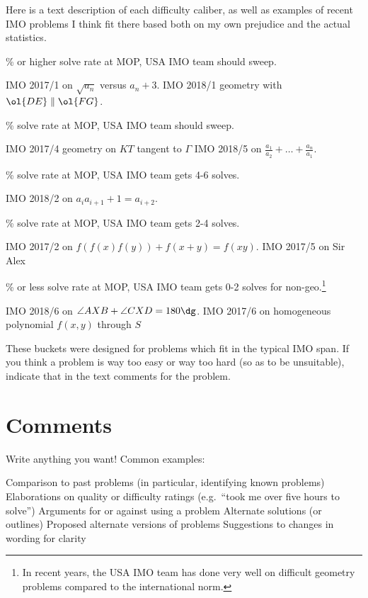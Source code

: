 Here is a text description of each difficulty caliber,
as well as examples of recent IMO problems I think fit there
based both on my own prejudice and the actual statistics.
\begin{description}
	\% or higher solve rate at MOP,
	USA IMO team should sweep.
	\begin{itemize}
		\ii IMO 2017/1 on $\sqrt{a_n}$ versus $a_n+3$.
		\ii IMO 2018/1 geometry with $\ol{DE} \parallel \ol{FG}$.
	\end{itemize}
	\% solve rate at MOP,
	USA IMO team should sweep.
	\begin{itemize}
		\ii IMO 2017/4 geometry on $KT$ tangent to $\Gamma$
		\ii IMO 2018/5 on $\frac{a_1}{a_2} + \dots + \frac{a_n}{a_1}$.
	\end{itemize}
	\% solve rate at MOP,
	USA IMO team gets 4-6 solves.
	\begin{itemize}
		\ii IMO 2018/2 on $a_i a_{i+1} + 1 = a_{i+2}$.
	\end{itemize}
	\% solve rate at MOP,
	USA IMO team gets 2-4 solves.
	\begin{itemize}
		\ii IMO 2017/2 on $f(f(x)f(y))+f(x+y) = f(xy)$.
		\ii IMO 2017/5 on Sir Alex
	\end{itemize}
	\% or less solve rate at MOP,
	USA IMO team gets 0-2 solves for non-geo.\footnote{In
		recent years, the USA IMO team has
		done very well on difficult geometry problems
		compared to the international norm.}
	\begin{itemize}
		\ii IMO 2018/6 on $\angle AXB + \angle CXD = 180\dg$.
		\ii IMO 2017/6 on homogeneous polynomial $f(x,y)$ through $S$
	\end{itemize}
\end{description}
These buckets were designed for problems
which fit in the typical IMO span.
If you think a problem is way too easy or way too hard
(so as to be unsuitable),
indicate that in the text comments for the problem.

\section{Comments}
Write anything you want! Common examples:
\begin{itemize}
	\ii Comparison to past problems
	(in particular, identifying known problems)
	\ii Elaborations on quality or difficulty ratings
	(e.g.\ ``took me over five hours to solve'')
	\ii Arguments for or against using a problem
	\ii Alternate solutions (or outlines)
	\ii Proposed alternate versions of problems
	\ii Suggestions to changes in wording for clarity
\end{itemize}


